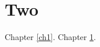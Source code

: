 \documentclass[openany]{book}
\begin{document}
\setcounter{chapter}{1}\chapter{Two}\label{ch2}Chapter \ref{ch1}.  Chapter \ref{ch2}.
\end{document}
